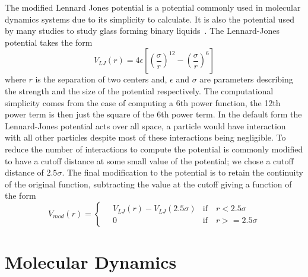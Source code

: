 The modified Lennard Jones potential is a potential commonly used in molecular dynamics systems due to its simplicity to calculate. It is also the potential used by many studies to study glass forming binary liquids~\cite{gotze:92,sciortino:99,glotzer:00,huer:08,royall:15}. The Lennard-Jones potential takes the form
\begin{equation}
    V_{LJ}(r) = 4\epsilon\left [ \left (\frac{\sigma}{r}\right )^{12} -\left ( \frac{\sigma}{r} \right )^6 \right]
\end{equation}
where $r$ is the separation of two centers and, $\epsilon$ and $\sigma$ are parameters describing the strength and the size of the potential respectively. The computational simplicity comes from the ease of computing a 6th power function, the 12th power term is then just the square of the 6th power term. In the default form the Lennard-Jones potential acts over all space, a particle would have interaction with all other particles despite most of these interactions being negligible. To reduce the number of interactions to compute the potential is commonly modified to have a cutoff distance at some small value of the potential; we chose a cutoff distance of $2.5\sigma$. The final modification to the potential is to retain the continuity of the original function, subtracting the value at the cutoff giving a function of the form
\begin{equation}
    V_{mod}(r) = \begin{cases}
        \quad V_{LJ}(r) - V_{LJ}(2.5\sigma) & \text{if}\quad r < 2.5\sigma \\
        \quad 0  &\text{if}\quad r >= 2.5\sigma
    \end{cases}
\end{equation}


\section{Molecular Dynamics}

